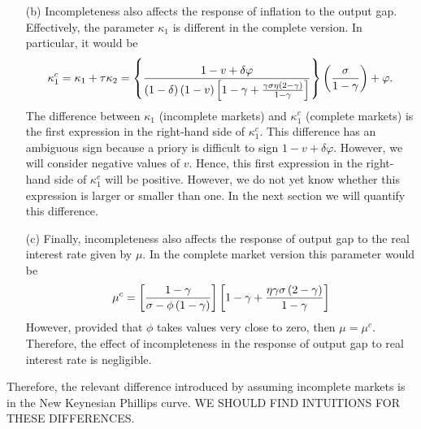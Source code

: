 \documentclass{article}
\begin{document}
\begin{enumerate}
\begin{itemize}
\item[(b)] Incompleteness also affects the response of inflation to the
output gap. Effectively, the parameter $\kappa _{1}$ is different in the
complete version. In particular, it would be%
\begin{equation*}
\kappa _{1}^{c}=\kappa _{1}+\tau \kappa _{2}=\left\{ \frac{1-v+\delta
\varphi }{\left( 1-\delta \right) \left( 1-v\right) \left[ 1-\gamma +\frac{%
\gamma \sigma \eta \left( 2-\gamma \right) }{1-\gamma }\right] }\right\}
\left( \frac{\sigma }{1-\gamma }\right) +\varphi .
\end{equation*}%
The difference between $\kappa _{1}$ (incomplete markets) and $\kappa
_{1}^{c}$ (complete markets) is the first expression in the right-hand side
of $\kappa _{1}^{c}.$ This difference has an ambiguous sign because a priory
is difficult to sign $1-v+\delta \varphi .$ However, we will consider
negative values of $v.$ Hence, this first expression in the right-hand side
of $\kappa _{1}^{c}$ will be positive. However, we do not yet know whether
this expression is larger or smaller than one. In the next section we will
quantify this difference.

\item[(c)] Finally, incompleteness also affects the response of output gap
to the real interest rate given by $\mu .$ In the complete market version
this parameter would be%
\begin{equation*}
\mu ^{c}=\left[ \frac{1-\gamma }{\sigma -\phi \left( 1-\gamma \right) }%
\right] \left[ 1-\gamma +\frac{\eta \gamma \sigma \left( 2-\gamma \right) }{%
1-\gamma }\right]
\end{equation*}%
However, provided that $\phi $ takes values very close to zero, then $\mu
=\mu ^{c}.$ Therefore, the effect of incompleteness in the response of
output gap to real interest rate is negligible.
\end{itemize}

Therefore, the relevant difference introduced by assuming incomplete markets
is in the New Keynesian Phillips curve. WE SHOULD FIND INTUITIONS FOR THESE
DIFFERENCES.


\end{enumerate}
\end{document}
